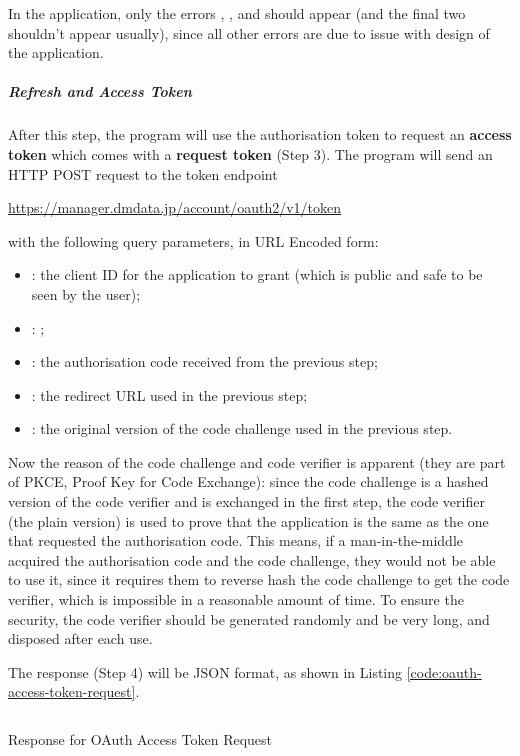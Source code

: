 In the application, only the errors , ,  and  should appear (and the final two shouldn't appear usually), since all other errors are due to issue with design of the application.

\subparagraph{Refresh and Access Token}

After this step, the program will use the authorisation token to request an \textbf{access token} which comes with a \textbf{request token} (Step 3). The program will send an HTTP POST request to the token endpoint
\begin{center}
    \url{https://manager.dmdata.jp/account/oauth2/v1/token}
\end{center}
with the following query parameters, in URL Encoded form:
\begin{itemize}
    \item {}: the client ID for the application to grant (which is public and safe to be seen by the user);
    \item {}: ;
    \item {}: the authorisation code received from the previous step;
    \item {}: the redirect URL used in the previous step;
    \item {}: the original version of the code challenge used in the previous step.
\end{itemize}

Now the reason of the code challenge and code verifier is apparent (they are part of PKCE, Proof Key for Code Exchange): since the code challenge is a hashed version of the code verifier and is exchanged in the first step, the code verifier (the plain version) is used to prove that the application is the same as the one that requested the authorisation code. This means, if a man-in-the-middle acquired the authorisation code and the code challenge, they would not be able to use it, since it requires them to reverse hash the code challenge to get the code verifier, which is impossible in a reasonable amount of time. To ensure the security, the code verifier should be generated randomly and be very long, and disposed after each use.

The response (Step 4) will be JSON format, as shown in Listing \ref{code:oauth-access-token-request}.

\begin{listing}[htp]
    \inputminted{json}{code/OAuthAccessTokenRequest.json}
    \caption{Response for OAuth Access Token Request}
    \label{code:oauth-access-token-request}
\end{listing}

